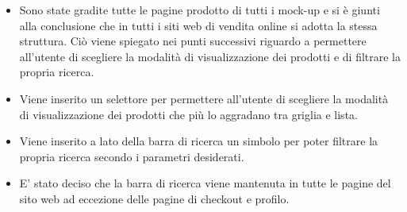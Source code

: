 \documentclass{report}
\begin{document}
\begin{itemize}
    \item {
        Sono state gradite tutte le pagine prodotto di tutti i mock-up e si è giunti alla conclusione che in tutti i siti web di vendita online si adotta la stessa struttura. Ciò viene spiegato nei punti successivi riguardo a permettere all'utente di scegliere la modalità di visualizzazione dei prodotti e di filtrare la propria ricerca.
    }
    \item {
        Viene inserito un selettore per permettere all'utente di scegliere la modalità di visualizzazione dei prodotti che più lo aggradano tra griglia e lista.
    }
    \item {
        Viene inserito a lato della barra di ricerca un simbolo per poter filtrare la propria ricerca secondo i parametri desiderati.
    }
    \item {
        E' stato deciso che la barra di ricerca viene mantenuta in tutte le pagine del sito web ad eccezione delle pagine di checkout e profilo. 
    }
\end{itemize}
\end{document}
